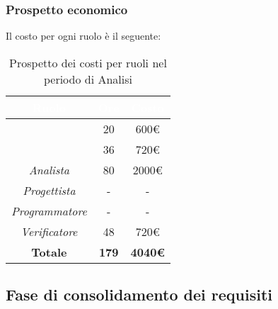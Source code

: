 \subsubsection{Prospetto economico}
Il costo per ogni ruolo è il seguente:
\begin{table}[H]
	\begin{center}
		\begin{tabular}{ |c c c| }
		\rowcolor{darkblue} 
		\textcolor{white}{\textbf{Ruolo}} & \textcolor{white}{\textbf{Ore}} & \textcolor{white}{\textbf{Costo}} \\ \hline
		\textit{\Responsabile} & 20 & 600€ \\ \hline
		\textit{\Amministratore} & 36 & 720€ \\ \hline
		\textit{Analista} & 80 & 2000€ \\ \hline
		\textit{Progettista} & - & - \\ \hline
		\textit{Programmatore}  & - & - \\ \hline
		\textit{Verificatore} & 48 & 720€ \\ \hline
		\textbf{Totale} & \textbf{179} & \textbf{4040€} \\ \hline
		\end{tabular}
	\caption{ Prospetto dei costi per ruoli nel periodo di Analisi}
	\end{center}
\end{table}

\subsection{Fase di consolidamento dei requisiti}
